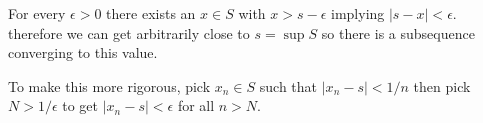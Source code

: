 \begin{solution}
  For every $\epsilon > 0$ there exists an $x \in S$ with $x > s - \epsilon$ implying $|s-x| < \epsilon$. therefore we can get arbitrarily close to $s = \sup S$ so there is a subsequence converging to this value.

  To make this more rigorous, pick $x_n \in S$ such that $|x_n - s| < 1/n$ then pick $N > 1/\epsilon$ to get $|x_n - s| < \epsilon$ for all $n > N$.
\end{solution}
